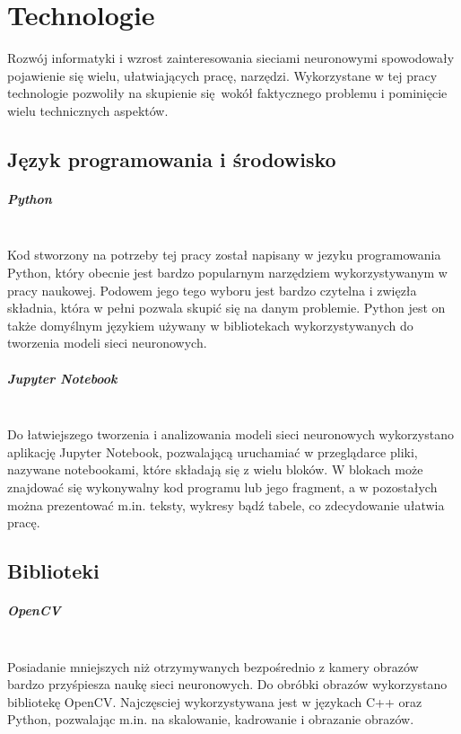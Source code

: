 
\chapter{Technologie}
Rozwój informatyki i wzrost zainteresowania sieciami neuronowymi spowodowały pojawienie
się wielu, ułatwiających pracę, narzędzi. Wykorzystane w tej pracy technologie
pozwoliły na skupienie się wokół faktycznego problemu i pominięcie wielu technicznych
aspektów.

\section{Język programowania i środowisko}

\paragraph{Python} \mbox{}\\
Kod stworzony na potrzeby tej pracy został napisany w jezyku programowania Python, który
obecnie jest bardzo popularnym narzędziem wykorzystywanym w pracy naukowej.
Podowem jego tego wyboru jest bardzo czytelna i zwięzła składnia,
która w pełni pozwala skupić się na danym problemie. Python jest on także domyślnym
językiem używany w bibliotekach wykorzystywanych do tworzenia modeli sieci neuronowych.

\paragraph{Jupyter Notebook} \mbox{}\\
Do łatwiejszego tworzenia i analizowania modeli sieci neuronowych wykorzystano aplikację
Jupyter Notebook, pozwalającą uruchamiać w przeglądarce pliki, nazywane notebookami,
które składają się z wielu bloków. W blokach może znajdować się wykonywalny kod programu
lub jego fragment, a w pozostałych można prezentować m.in. teksty, wykresy bądź tabele,
co zdecydowanie ułatwia pracę.\\

\section{Biblioteki}

\paragraph{OpenCV} \mbox{}\\
Posiadanie mniejszych niż otrzymywanych bezpośrednio z kamery obrazów bardzo przyśpiesza
naukę sieci neuronowych. Do obróbki obrazów wykorzystano bibliotekę OpenCV.
Najczęsciej wykorzystywana jest w językach C++ oraz Python, pozwalając m.in. na
skalowanie, kadrowanie i obrazanie obrazów.

